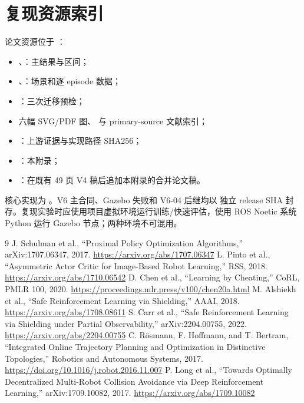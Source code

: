 \documentclass[12pt,a4paper,oneside]{report}
\begin{document}
\chapter{复现资源索引}
论文资源位于 ：
\begin{itemize}
  \item {}、：主结果与区间；
  \item {}、：场景和逐 episode 数据；
  \item {}：三次迁移预检；
  \item 六幅 SVG/PDF 图、 与 primary-source 文献索引；
  \item {}：上游证据与实现路径 SHA256；
  \item {}：本附录；
  \item {}：在既有 49 页 V4 稿后追加本附录的合并论文稿。
\end{itemize}

核心实现为 。V6 主合同、Gazebo 失败和 V6-04 后继均以
独立 release SHA 封存。复现实验时应使用项目虚拟环境运行训练/快速评估，使用 ROS Noetic 系统
Python 运行 Gazebo 节点；两种环境不可混用。

\begin{thebibliography}{9}
 J. Schulman et al., ``Proximal Policy Optimization Algorithms,'' arXiv:1707.06347, 2017. \url{https://arxiv.org/abs/1707.06347}
 L. Pinto et al., ``Asymmetric Actor Critic for Image-Based Robot Learning,'' RSS, 2018. \url{https://arxiv.org/abs/1710.06542}
 D. Chen et al., ``Learning by Cheating,'' CoRL, PMLR 100, 2020. \url{https://proceedings.mlr.press/v100/chen20a.html}
 M. Alshiekh et al., ``Safe Reinforcement Learning via Shielding,'' AAAI, 2018. \url{https://arxiv.org/abs/1708.08611}
 S. Carr et al., ``Safe Reinforcement Learning via Shielding under Partial Observability,'' arXiv:2204.00755, 2022. \url{https://arxiv.org/abs/2204.00755}
 C. Rösmann, F. Hoffmann, and T. Bertram, ``Integrated Online Trajectory Planning and Optimization in Distinctive Topologies,'' Robotics and Autonomous Systems, 2017. \url{https://doi.org/10.1016/j.robot.2016.11.007}
 P. Long et al., ``Towards Optimally Decentralized Multi-Robot Collision Avoidance via Deep Reinforcement Learning,'' arXiv:1709.10082, 2017. \url{https://arxiv.org/abs/1709.10082}
\end{thebibliography}
\end{document}
